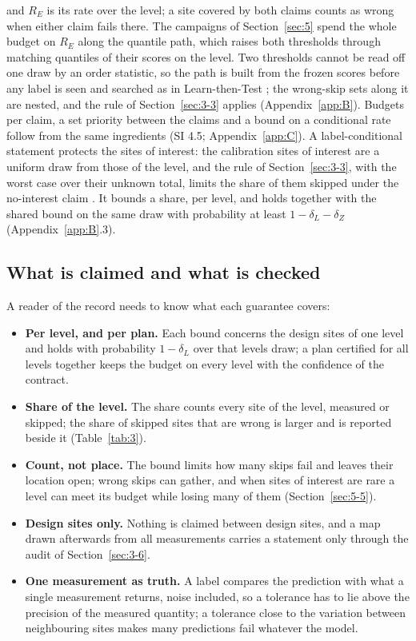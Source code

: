 \documentclass{iopjournal}
\providecommand{\tightlist}{\setlength{\itemsep}{0pt}\setlength{\parskip}{0pt}}
\begin{document}
and \(R_E\) is its rate over the level; a site covered by both claims counts as wrong when either claim fails there. The campaigns of Section~\ref{sec:5} spend the whole budget on \(R_E\) along the quantile path, which raises both thresholds through matching quantiles of their scores on the level. Two thresholds cannot be read off one draw by an order statistic, so the path is built from the frozen scores before any label is seen and searched as in Learn-then-Test \cite{Angelopoulos2025}; the wrong-skip sets along it are nested, and the rule of Section~\ref{sec:3-3} applies (Appendix~\ref{app:B}). Budgets per claim, a set priority between the claims and a bound on a conditional rate follow from the same ingredients (SI 4.5; Appendix~\ref{app:C}). A label-conditional statement protects the sites of interest: the calibration sites of interest are a uniform draw from those of the level, and the rule of Section~\ref{sec:3-3}, with the worst case over their unknown total, limits the share of them skipped under the no-interest claim \cite{Vovk2005,Sadinle2019,Tong2018}. It bounds a share, per level, and holds together with the shared bound on the same draw with probability at least \(1 - \delta_L - \delta_Z\) (Appendix~\ref{app:B}.3).

\hypertarget{sec:3-5}{%
\subsection{What is claimed and what is checked}\label{sec:3-5}}

A reader of the record needs to know what each guarantee covers:

\begin{itemize}
\tightlist
\item
  \textbf{Per level, and per plan.} Each bound concerns the design sites of one level and holds with probability \(1 - \delta_L\) over that level\textquotesingle s draw; a plan certified for all levels together keeps the budget on every level with the confidence of the contract.
\item
  \textbf{Share of the level.} The share counts every site of the level, measured or skipped; the share of skipped sites that are wrong is larger and is reported beside it (Table~\ref{tab:3}).
\item
  \textbf{Count, not place.} The bound limits how many skips fail and leaves their location open; wrong skips can gather, and when sites of interest are rare a level can meet its budget while losing many of them (Section~\ref{sec:5-5}).
\item
  \textbf{Design sites only.} Nothing is claimed between design sites, and a map drawn afterwards from all measurements carries a statement only through the audit of Section~\ref{sec:3-6}.
\item
  \textbf{One measurement as truth.} A label compares the prediction with what a single measurement returns, noise included, so a tolerance has to lie above the precision of the measured quantity; a tolerance close to the variation between neighbouring sites makes many predictions fail whatever the model.
\end{itemize}
\end{document}
